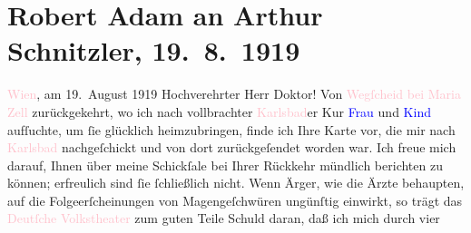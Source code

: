 

               \section[Robert Adam an Arthur Schnitzler, 19. 8. 1919]{ Robert Adam an Arthur Schnitzler, 19. 8. 1919}\nopagebreak{}\rehead{ }\normalsize\beginnumbering{} \toendnotes[C]{\smallbreak\pagebreak[2]} 
\toendnotes[C]{\smallbreak}\pstart
           \raggedleft{}{\pb}\textcolor{pink}{Wien}{}\ledrightnote{\textcolor{pink}{Wien}}, am 19. August 1919\pend
           \pstart\center{}Hochverehrter Herr Doktor!\pend\pstart
           Von \textcolor{pink}{Wegſcheid bei Maria Zell}{}\ledrightnote{\textcolor{pink}{Wegscheid}} zurückgekehrt, wo
                    ich nach vollbrachter \textcolor{pink}{Karlsbad}{}\ledrightnote{\textcolor{pink}{Karlsbad}}er Kur \textcolor{blue}{Frau}{} und \textcolor{blue}{Kind}{} aufſuchte, um ſie glücklich
                    heimzubringen, finde ich Ihre Karte vor, die mir nach \textcolor{pink}{Karlsbad}{}\ledrightnote{\textcolor{pink}{Karlsbad}} nachgeſchickt und von dort zurückgeſendet worden
                    war. Ich freue mich darauf, Ihnen über meine Schickſale bei Ihrer Rückkehr
                    mündlich berichten zu können; erfreulich sind ſie ſchließlich nicht. Wenn Ärger,
                    wie die Ärzte behaupten, auf die Folgeerſcheinungen von Magengeſchwüren
                    ungünſtig einwirkt, so trägt das \textcolor{pink}{Deutſche
                        Volkstheater}{}\ledrightnote{\textcolor{pink}{Volkstheater}} zum guten Teile Schuld daran, daß ich mich durch vier
